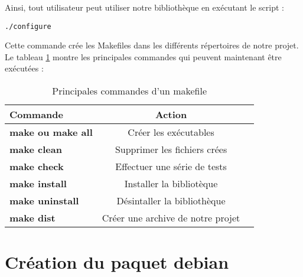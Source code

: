 Ainsi, tout utilisateur peut utiliser notre biblioth\`eque en ex\'ecutant le script :
\begin{verbatim}./configure\end{verbatim}
Cette commande cr\'ee les Makefiles dans les diff\'erents r\'epertoires de notre projet.
Le tableau \ref{tab:commandes} montre les principales commandes qui peuvent maintenant \^etre ex\'ecut\'ees :
\begin{table}[h]
\begin{center}

\begin{tabular}{|l|c|r|}
  \hline
  Commande &  Action\\
  \hline
  \textbf{make ou make all} & Cr\'eer les ex\'ecutables \\
  \textbf{make clean} & Supprimer les fichiers cr\'ees\\
  \textbf{make check} & Effectuer une s\'erie de tests \\
  \textbf{make install} & Installer la bibliot\`eque \\
  \textbf{make uninstall} & D\'esintaller la biblioth\`eque \\
  \textbf{make dist} & Cr\'eer une archive de notre projet \\
  \hline
\end{tabular}
\end{center}
\caption{Principales commandes d'un makefile}
\label{tab:commandes}
\end{table}

\section{Cr\'eation du paquet debian}

